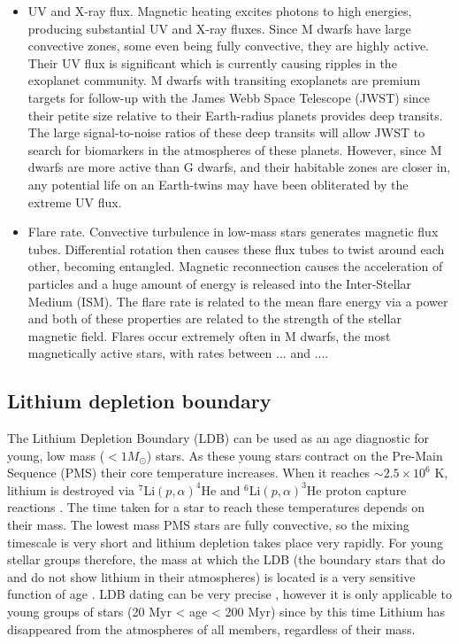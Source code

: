\begin{itemize}
{Crucially though, measurements of Ca II H \& K emission are difficult to
obtain since high-resolution spectra are required.
}
\item{UV and X-ray flux.}
Magnetic heating excites photons to high energies, producing substantial UV
and X-ray fluxes.
Since M dwarfs have large convective zones, some even being fully convective,
they are highly active.
Their UV flux is significant which is currently causing ripples in the
exoplanet community.
M dwarfs with transiting exoplanets are premium targets for follow-up with the
James Webb Space Telescope (JWST) since their petite size relative to their
Earth-radius planets provides deep transits.
The large signal-to-noise ratios of these deep transits will allow JWST to
search for biomarkers in the atmospheres of these planets.
However, since M dwarfs are more active than G dwarfs, and their habitable
zones are closer in, any potential life on an Earth-twins may have been
obliterated by the extreme UV flux.
\item{Flare rate.
Convective turbulence in low-mass stars generates magnetic flux tubes.
Differential rotation then causes these flux tubes to twist around each other,
becoming entangled.
Magnetic reconnection causes the acceleration of particles and a huge amount
of energy is released into the Inter-Stellar Medium (ISM).
The flare rate is related to the mean flare energy via a power and both of
these properties are related to the strength of the stellar magnetic field.
Flares occur extremely often in M dwarfs, the most magnetically active stars,
with rates between ... and ....
}
\end{itemize}

\subsection{Lithium depletion boundary}
The Lithium Depletion Boundary (LDB) can be used as an age diagnostic for
young, low mass ($<1M_\odot$) stars.
As these young stars contract on the Pre-Main Sequence (PMS) their core
temperature increases.
When it reaches $\sim2.5\times10^6$ K, lithium is destroyed via $^7$Li$(p,
\alpha)^4$He and $^6$Li$(p, \alpha)^3$He proton capture reactions
\citep[\eg][]{Bodenheimer1965}.
The time taken for a star to reach these temperatures depends on their mass.
The lowest mass PMS stars are fully convective, so the mixing timescale is
very short and lithium depletion takes place very rapidly.
For young stellar groups therefore, the mass at which the LDB (the boundary
stars that do and do not show lithium in their atmospheres) is located is a
very sensitive function of age \citep{Basri1996}.
LDB dating can be very precise \citep{Burke2004}, however it is only
applicable to young groups of stars (20 Myr < age < 200 Myr) since by this
time Lithium has disappeared from the atmospheres of all members, regardless
of their mass.

